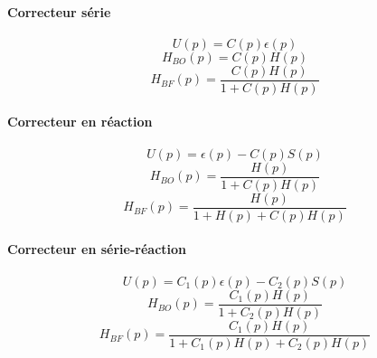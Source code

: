 \paragraph{Correcteur série}
\begin{center}
    
\end{center}
\[
    U(p)=C(p)\epsilon(p)
\]
\[
    H_{BO}(p)=C(p)H(p)
\]
\[
    H_{BF}(p)=\dfrac{C(p)H(p)}{1+C(p)H(p)}
\]
\paragraph{Correcteur en réaction}
\begin{center}
    
\end{center}
\[
    U(p)=\epsilon(p)-C(p)S(p)
\]
\[
    H_{BO}(p)=\dfrac{H(p)}{1+C(p)H(p)}
\]
\[
    H_{BF}(p)=\dfrac{H(p)}{1+H(p)+C(p)H(p)}
\]
\paragraph{Correcteur en série-réaction}
\begin{center}
    
\end{center}
\[
    U(p)=C_1(p)\epsilon(p)-C_2(p)S(p)
\]
\[
    H_{BO}(p)=\dfrac{C_1(p)H(p)}{1+C_2(p)H(p)}
\]
\[
    H_{BF}(p)=\dfrac{C_1(p)H(p)}{1+C_1(p)H(p)+C_2(p)H(p)}
\]
